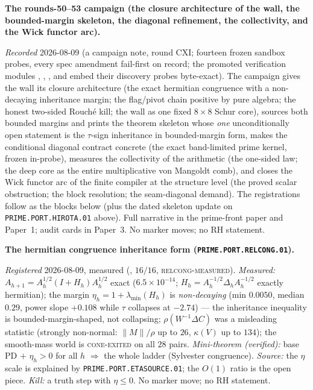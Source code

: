 \par\smallskip\noindent\textbf{The rounds-50--53 campaign (the
closure architecture of the wall, the bounded-margin skeleton,
the diagonal refinement, the collectivity, and the Wick
functor arc).}
{\sloppy
\emph{Recorded} 2026-08-09 (a campaign note, round CXI;
fourteen frozen sandbox probes, every spec amendment
fail-first on record; the promoted verification modules
,
,
,
 and
 embed their discovery
probes byte-exact).  The campaign gives the wall its closure
architecture (the exact hermitian congruence with a
non-decaying inheritance margin; the flag/pivot chain positive
by pure algebra; the honest two-sided Rouch\'e kill; the wall
as one fixed $8\times8$ Schur core), sources both bounded
margins and prints the theorem skeleton whose \emph{one}
unconditionally open statement is the $\tau$-sign inheritance
in bounded-margin form, makes the conditional diagonal
contract concrete (the exact band-limited prime kernel, frozen
in-probe), measures the collectivity of the arithmetic (the
one-sided law; the deep core as the entire multiplicative von
Mangoldt comb), and closes the Wick functor arc of the finite
compiler at the structure level (the proved scalar
obstruction; the block resolution; the seam-diagonal demand).
The registrations follow as the blocks below (plus the dated
skeleton update on \texttt{PRIME.PORT.HIROTA.01} above).  Full
narrative in the prime-front paper and Paper~1; audit cards in
Paper~3.  No marker moves; no RH statement.\par}


\par\smallskip\noindent\textbf{The hermitian congruence
inheritance form
(\texttt{PRIME.PORT.\allowbreak RELCONG.01}).}
{\sloppy
\emph{Registered} 2026-08-09, measured
(, $16/16$,
\textsc{relcong-measured}).  \emph{Measured:} $A_{h+1} =
A_h^{1/2}(I + H_h)A_h^{1/2}$ exact ($6.5\times10^{-14}$; $H_h
= A_h^{-1/2}\Delta_h A_h^{-1/2}$ exactly hermitian); the
margin $\eta_h = 1 + \lambda_{\min}(H_h)$ is
\emph{non-decaying} (min $0.0050$, median $0.29$, power slope
$+0.108$ while $\tau$ collapses at $-2.74$) --- the
inheritance inequality is bounded-margin-shaped, not
collapsing; $\rho(W^{-1}\Delta C)$ was a misleading statistic
(strongly non-normal: $\|M\|/\rho$ up to $26$, $\kappa(V)$ up
to $134$); the smooth-mass world is \textsc{cone-exited} on
all $28$ pairs.  \emph{Mini-theorem (verified):} base PD $+$
$\eta_h > 0$ for all $h$ $\Rightarrow$ the whole ladder
(Sylvester congruence).  \emph{Source:} the $\eta$ scale is
explained by \texttt{PRIME.PORT.ETASOURCE.01}; the $O(1)$
ratio is the open piece.  \emph{Kill:} a truth step with
$\eta \le 0$.  No marker move; no RH statement.\par}



